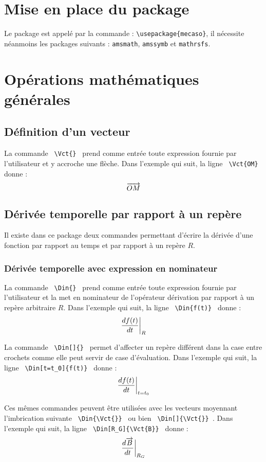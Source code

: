 \documentclass[12pt]{article}
\begin{document}
\section{Mise en place du package}

Le package est appelé par la commande : \verb|\usepackage{mecaso}|, il nécessite néanmoins les packages suivants : \verb|amsmath|, \verb|amssymb| et \verb|mathrsfs|.

\newpage

\section{Opérations mathématiques générales}

\subsection{Définition d'un vecteur}
La commande \verb| \Vct{} | prend comme entrée toute expression fournie par l'utilisateur et y accroche une flèche. Dans l'exemple qui suit, la ligne  \verb| \Vct{OM} | donne : $$ \Vct{OM} $$

\subsection{Dérivée temporelle par rapport à un repère}
Il existe dans ce package deux commandes permettant d'écrire la dérivée d'une fonction par rapport au temps et par rapport à un repère $R$.

\subsubsection{Dérivée temporelle avec expression en nominateur}
La commande \verb| \Din{} | prend comme entrée toute expression fournie par l'utilisateur et la met en nominateur de l'opérateur dérivation par rapport à un repère arbitraire $R$. Dans l'exemple qui suit, la ligne  \verb| \Din{f(t)} | donne : $$ \Din{f(t)} $$

La commande \verb| \Din[]{} | permet d'affecter un repère différent dans la case entre crochets comme elle peut servir de case d'évaluation. Dans l'exemple qui suit, la ligne  \verb| \Din[t=t_0]{f(t)} | donne : $$ \Din[t=t_0]{f(t)} $$

Ces mêmes commandes peuvent être utilisées avec les vecteurs moyennant l'imbrication suivante \verb| \Din{\Vct{}} | ou bien \verb| \Din[]{\Vct{}} |. Dans l'exemple qui suit, la ligne  \verb| \Din[R_G]{\Vct{B}} | donne : $$ \Din[R_G]{\Vct{B}} $$
\end{document}
